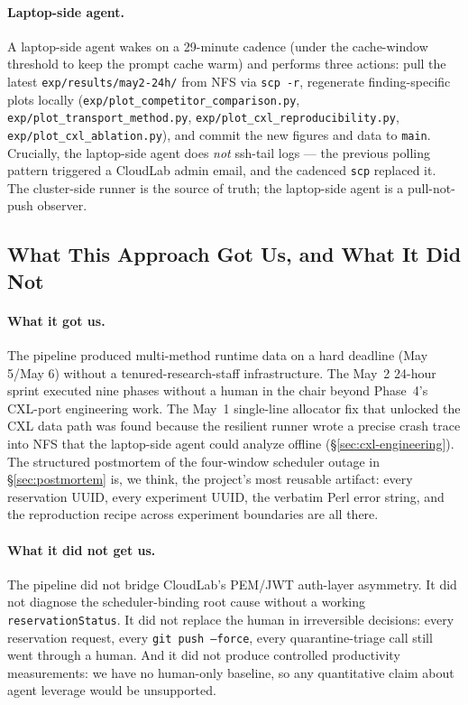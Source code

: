 \documentclass[11pt,a4paper]{article}
\begin{document}
\paragraph{Laptop-side agent.} A laptop-side agent wakes on a 29-minute cadence (under the cache-window threshold to keep the prompt cache warm) and performs three actions: pull the latest \texttt{exp/results/may2-24h/} from NFS via \texttt{scp -r}, regenerate finding-specific plots locally (\texttt{exp/plot\_competitor\_comparison.py}, \texttt{exp/plot\_transport\_method.py}, \texttt{exp/plot\_cxl\_reproducibility.py}, \texttt{exp/plot\_cxl\_ablation.py}), and commit the new figures and data to \texttt{main}. Crucially, the laptop-side agent does \emph{not} ssh-tail logs --- the previous polling pattern triggered a CloudLab admin email, and the cadenced \texttt{scp} replaced it. The cluster-side runner is the source of truth; the laptop-side agent is a pull-not-push observer.

\subsection{What This Approach Got Us, and What It Did Not}
\label{sec:approach:limits}

\paragraph{What it got us.} The pipeline produced multi-method runtime data on a hard deadline (May 5/May 6) without a tenured-research-staff infrastructure. The May~2 24-hour sprint executed nine phases without a human in the chair beyond Phase~4's CXL-port engineering work. The May~1 single-line allocator fix that unlocked the CXL data path was found because the resilient runner wrote a precise crash trace into NFS that the laptop-side agent could analyze offline (\S\ref{sec:cxl-engineering}). The structured postmortem of the four-window scheduler outage in §\ref{sec:postmortem} is, we think, the project's most reusable artifact: every reservation UUID, every experiment UUID, the verbatim Perl error string, and the reproduction recipe across experiment boundaries are all there.

\paragraph{What it did not get us.} The pipeline did not bridge CloudLab's PEM/JWT auth-layer asymmetry. It did not diagnose the scheduler-binding root cause without a working \texttt{reservationStatus}. It did not replace the human in irreversible decisions: every reservation request, every \texttt{git push --force}, every quarantine-triage call still went through a human. And it did not produce controlled productivity measurements: we have no human-only baseline, so any quantitative claim about agent leverage would be unsupported.
\end{document}
